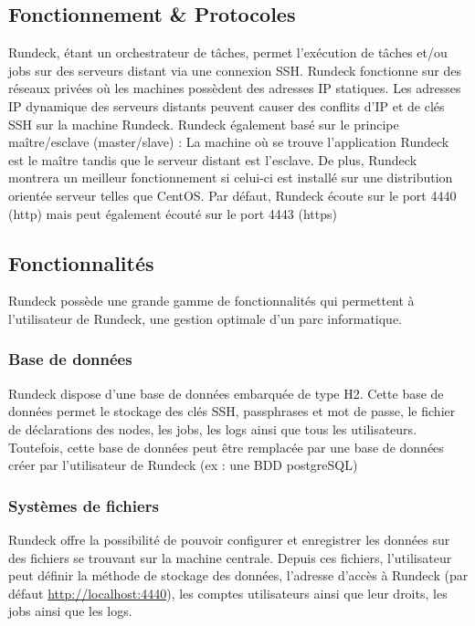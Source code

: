 \documentclass[12pt]{article}
\begin{document}
\subsection{Fonctionnement \& Protocoles}

Rundeck, étant un orchestrateur de tâches, permet l'exécution de tâches et/ou jobs sur des serveurs distant via une connexion SSH. Rundeck fonctionne sur des réseaux privées où les machines possèdent des adresses IP statiques. Les adresses IP dynamique des serveurs distants peuvent causer des conflits d'IP et de clés SSH sur la machine Rundeck.
Rundeck également basé sur le principe maître/esclave (master/slave) : La machine où se trouve l'application Rundeck est le maître tandis que le serveur distant est l'esclave. De plus, Rundeck montrera un meilleur fonctionnement si celui-ci est installé sur une distribution orientée serveur telles que CentOS. Par défaut, Rundeck écoute sur le port 4440 (http) mais peut également écouté sur le port 4443 (https)

\subsection{Fonctionnalités}

Rundeck possède une grande gamme de fonctionnalités qui permettent à l'utilisateur de Rundeck, une gestion optimale d'un parc informatique.

\subsubsection{Base de données}

Rundeck dispose d'une base de données embarquée de type H2. Cette base de données permet le stockage des clés SSH, passphrases et mot de passe, le fichier de déclarations des nodes, les jobs, les logs ainsi que tous les utilisateurs.
Toutefois, cette base de données peut être remplacée par une base de données créer par l'utilisateur de Rundeck (ex : une BDD postgreSQL)

\subsubsection{Systèmes de fichiers}

Rundeck offre la possibilité de pouvoir configurer et enregistrer les données sur des fichiers se trouvant sur la machine centrale. Depuis ces fichiers, l'utilisateur peut définir la méthode de stockage des données, l'adresse d'accès à Rundeck (par défaut \url{http://localhost:4440}), les comptes utilisateurs ainsi que leur droits, les jobs ainsi que les logs.
\end{document}
